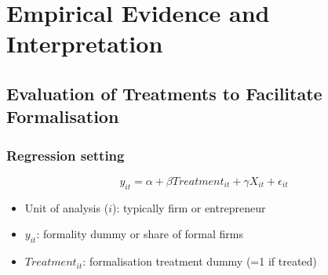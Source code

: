 \section{Empirical Evidence and Interpretation}

    \subsection{Evaluation of Treatments to Facilitate Formalisation}
        \subsubsection{Regression setting}
            \begin{equation}
                y_{it}=\alpha+ \beta Treatment_{it} +\gamma X_{it}+\epsilon_{it}
                \label{eqn:formality regression 1}
            \end{equation}
            \begin{itemize}
                \item Unit of analysis ($i$): typically firm or entrepreneur
                \item $y_{it}$: formality dummy or share of formal firms
                \item $Treatment_{it}$: formalisation treatment dummy (=1 if treated)
            \end{itemize}
